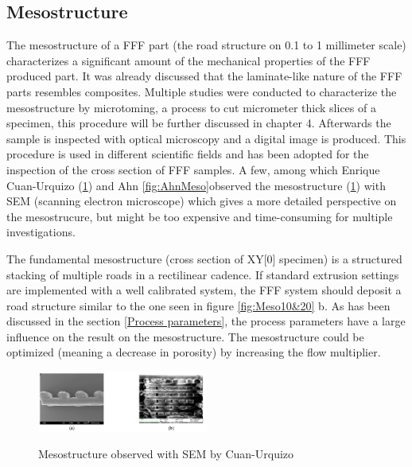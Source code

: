 \subsection{Mesostructure}
\label{mesostructure}
The mesostructure of a FFF part (the road structure on 0.1 to 1 millimeter scale) characterizes a significant amount of the mechanical properties of the FFF produced part. It was already discussed that the laminate-like nature of the FFF parts resembles composites. Multiple studies \cite{Somireddy2017MechanicalMesostructure} \cite{Somireddy2018DevelopmentFDM} \cite{Rodriguez2001MechanicalInvestigation} were conducted to characterize the mesostructure by microtoming, a process to cut micrometer thick slices of a specimen, this procedure will be further discussed in chapter 4. Afterwards the sample is inspected with optical microscopy and a digital image is produced. This procedure is used in different scientific fields and has been adopted for the inspection of the cross section of FFF samples. A few, among which Enrique Cuan-Urquizo \cite{Cuan-Urquizo2019CharacterizationApproaches} (\ref{fig:SEMmesostructure}) and Ahn \cite{Ahn2002AnisotropicABS} \ref{fig:AhnMeso}observed the mesostructure (\ref{fig:SEMmesostructure}) with SEM (scanning electron microscope) which gives a more detailed perspective on the mesostrucure, but might be too expensive and time-consuming for multiple investigations.



The fundamental mesostructure (cross section of XY[0] specimen) is a structured stacking of multiple roads in a rectilinear cadence. If standard extrusion settings are implemented with a well calibrated system, the FFF system should deposit a road structure similar to the one seen in figure \ref{fig:Meso10&20} b. As has been discussed in the section \ref{Process parameters}, the process parameters have a large influence on the result on the mesostructure.  The mesostructure could be optimized (meaning a decrease in porosity) by increasing the flow multiplier.

\begin{figure}[H]
    \centering
    \includegraphics[width=0.5\textwidth]{chapter_2/figures/SEMmesostructure.PNG}
    \caption{Mesostructure observed with SEM by Cuan-Urquizo} \cite{Cuan-Urquizo2019CharacterizationApproaches}
    \label{fig:SEMmesostructure}
\end{figure}

